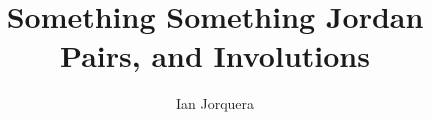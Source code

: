 \documentclass{article}
\title{Something Something Jordan Pairs, and Involutions}
\author{Ian Jorquera}
\begin{document}
\maketitle



\nocite{*}


\end{document}
